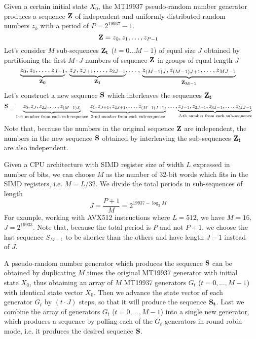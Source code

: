 \documentclass[preprint,1p,times]{elsarticle}
\begin{document}
Given a certain initial state $X_0$, the MT19937 pseudo-random number generator produces a sequence $\bold{Z}$ of independent and uniformly distributed random numbers $z_k$ with a period of $P=2^{19937}-1$.
\begin{equation}
\label{eq:mainseq}
   \bold{Z} = z_0, z_1, \dots, z_{P-1} 
\end{equation}
Let's consider $M$ sub-sequences $\bold{Z_t}$ ($t=0\dots M-1$) of equal size $J$ obtained by partitioning the first $M\cdot J$ numbers of sequence $\bold{Z}$ in groups of equal length $J$
\begin{equation}
\label{eq:subseq}
   \underbrace{z_0, z_1, \dots, z_{J-1}}_{\bold{Z_0}},\, \underbrace{z_J, z_{J+1}, \dots, z_{2J-1}}_{\bold{Z_1}}, \dots,\, \underbrace{z_{(M-1)J}, z_{(M-1)J+1}, \dots, z_{MJ-1}}_{\bold{Z_{M-1}}}
\end{equation}
Let's construct a new sequence $\bold{S}$ which interleaves the sequences $\bold{Z_t}$
\begin{equation}
\label{eq:combseq}
   \bold{S}=\underbrace{z_0, z_J, z_{2J}, \dots, z_{(M-1)J,}}_{\text{1-st number from each sub-sequence}} \,\underbrace{z_1, z_{J+1}, z_{2J+1}, \dots, z_{(M-1)J+1},}_{\text{2-nd number from each sub-sequence}}\, \dots, \underbrace{z_{J-1}, z_{2J-1}, z_{3J-1}, \dots, z_{MJ-1}}_{\text{$J$-th number from each sub-sequence}}
\end{equation}
Note that, because the numbers in the original sequence $\bold{Z}$ are independent, the numbers in the new sequence $\bold{S}$ obtained by interleaving the sub-sequences $\bold{Z_t}$ are also independent.

Given a CPU architecture with SIMD register size of width $L$ expressed in number of bits, we can choose $M$ as the number of 32-bit words which fits in the SIMD registers, i.e. $M=L/32$. We divide the total periods in sub-sequences of length $$J=\frac{P+1}{M}=2^{19937-\log_2M}$$
For example, working with AVX512 instructions where $L=512$, we have $M=16$, $J=2^{19933}$. Note that, because the total period is $P$ and not $P+1$, we choose the last sequence $S_{M-1}$ to be shorter than the others and have length $J-1$ instead of $J$.

A pseudo-random number generator which produces the sequence $\bold{S}$ can be obtained by duplicating $M$ times the original MT19937 generator with initial state $X_0$, thus obtaining an array of $M$ MT19937 generators $G_t$ ($t=0,\dots, M-1$) with identical state vector $X_0$. Then we advance the state vector of each generator $G_t$ by $(t\cdot J)$ steps, so that it will produce the sequence $\bold{S_t}$. Last we combine the array of generators $G_t$ ($t=0,\dots, M-1$) into a single new generator, which produces a sequence by polling each of the $G_t$ generators in round robin mode, i.e. it produces the desired sequence $\bold{S}$.
\end{document}
